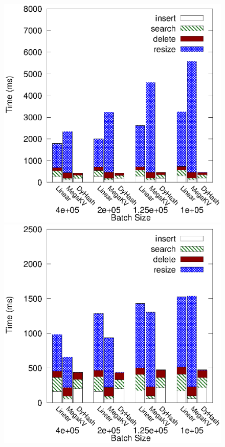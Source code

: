 \begin{figure}[h]
	\begin{minipage}{0.18\linewidth}\centering
		\includegraphics[width=\linewidth]{pic/dynamic/twitter/diff_batch_size.eps}
		\centerline{\dstwitter}
	\end{minipage}
	\hfill
	\begin{minipage}{0.18\linewidth}\centering
		\includegraphics[width=\linewidth]{pic/dynamic/reddit/diff_batch_size.eps}

\end{minipage}
\end{figure}
